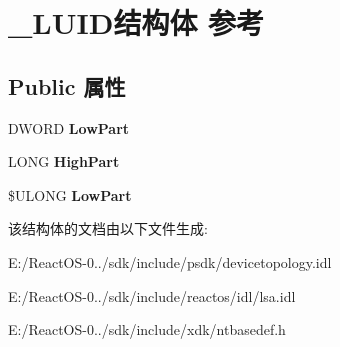 \hypertarget{struct___l_u_i_d}{}\section{\+\_\+\+L\+U\+I\+D结构体 参考}
\label{struct___l_u_i_d}
\subsection*{Public 属性}
\begin{DoxyCompactItemize}
\item 
\mbox{\label{struct___l_u_i_d_a91b3409c730fd479317c8b541c2955fa}} 
D\+W\+O\+RD {\bfseries Low\+Part}
\item 
\mbox{\label{struct___l_u_i_d_a0e9710aebde2d7edbf152dc68fe549ac}} 
L\+O\+NG {\bfseries High\+Part}
\item 
\mbox{\label{struct___l_u_i_d_aab16619299b030951fecf4d78c02a56c}} 
\$U\+L\+O\+NG {\bfseries Low\+Part}
\end{DoxyCompactItemize}


该结构体的文档由以下文件生成\+:\begin{DoxyCompactItemize}
\item 
E\+:/\+React\+O\+S-\/0../sdk/include/psdk/devicetopology.\+idl\item 
E\+:/\+React\+O\+S-\/0../sdk/include/reactos/idl/lsa.\+idl\item 
E\+:/\+React\+O\+S-\/0../sdk/include/xdk/ntbasedef.\+h\end{DoxyCompactItemize}
